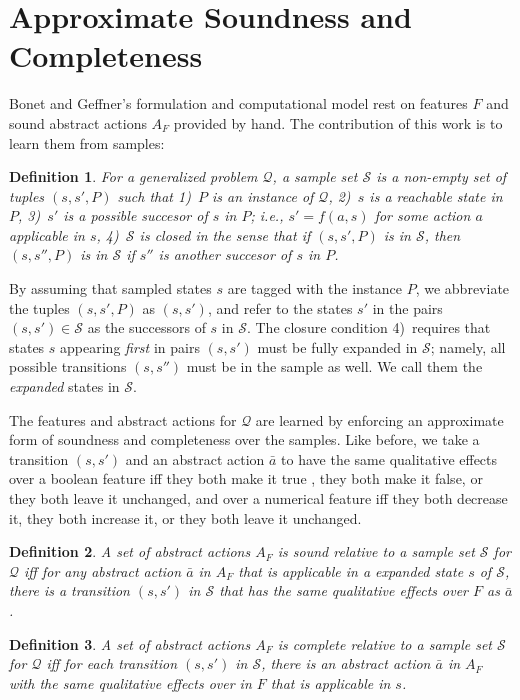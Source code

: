 \documentclass[letterpaper]{article} %
\newtheorem{definition}{Definition}
\newcommand{\Q}{\mathcal{Q}}
\renewcommand{\S}{\mathcal{S}}
\begin{document}
\section{Approximate Soundness and Completeness}

Bonet and Geffner's formulation and computational model rest on 
features $F$ and  sound abstract actions $A_F$ provided by hand.
The contribution of this work is to learn them  from samples:


\begin{definition}
  For a generalized problem $\Q$, a \emph{sample set}  $\S$ is a non-empty set of tuples  $(s,s',P)$
  such that 1)~$P$ is an instance of $\Q$, 2)~$s$ is a reachable state in $P$, 3)~$s'$
  is a possible succesor of $s$ in $P$; i.e., $s'=f(a,s)$ for some action $a$ applicable in $s$,
  4)~$\S$ is closed in the sense  that if $(s,s',P)$ is in $\S$, then $(s,s'',P)$ is in $\S$  if $s''$ is another
  succesor of $s$ in $P$.
\end{definition}

By assuming that sampled states $s$ are tagged with the instance $P$, 
we abbreviate the tuples $(s,s',P)$ as $(s,s')$, and refer to the
states $s'$ in  the pairs $(s,s') \in \S$ as the successors of
$s$ in $\S$. The  closure condition 4)~requires that
states $s$ appearing \emph{first} in pairs $(s,s')$ must be fully expanded in $\S$;
namely, all possible transitions $(s,s'')$ must be in the sample as well. We call them
the \emph{expanded} states in $\S$.

The features and abstract actions for $\Q$ are  learned by
enforcing an approximate form of soundness and completeness
over the samples. Like before,  we take a transition $(s,s')$ and an abstract action $\bar{a}$
to have  the same qualitative effects over a boolean  feature  iff they both make it true , they both make it false,  or
they both leave it unchanged,  and over a numerical feature  iff they both decrease it,  they both increase it,  or they both leave it unchanged.

\begin{definition}
  A set of abstract actions $A_F$ is sound \emph{relative to a  sample set} $\S$ for $\Q$
  iff for  any  abstract action $\bar{a}$ in $A_F$ that is applicable in  a expanded state $s$ of $\S$,
  there is a transition $(s,s')$ in $\S$ that has the same qualitative  effects over $F$ as $\bar{a}$.
\end{definition}

\begin{definition}
  A set of abstract actions $A_F$ is complete   \emph{relative to a sample set} $\S$ for $\Q$
  iff for each transition  $(s,s')$ in  $\S$, there is an abstract action $\bar{a}$ in $A_F$
  with the same qualitative effects over in $F$ that is applicable in $s$.
\end{definition}
\end{document}
